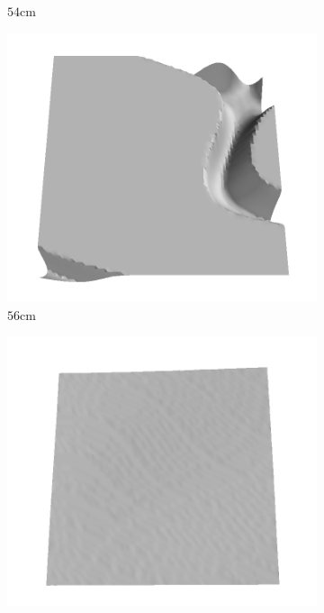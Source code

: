 \documentclass[../document.tex]{subfiles}
\begin{document}
\begin{figure}[htbp]
\begin{subfigure}[b]{0.19\textwidth}
    \caption{$54$cm}
    \end{subfigure}
    \begin{subfigure}[b]{0.19\textwidth}
    \includegraphics[width=\linewidth]{../img/5/train/all/56-patch-3d-majavi-28.png}
    \caption{$56$cm}
    \end{subfigure}
    \begin{subfigure}[b]{0.19\textwidth}
    \includegraphics[width=\linewidth]{../img/5/train/all/57-patch-3d-majavi-29.png}

\end{subfigure}
\end{figure}
\end{document}
